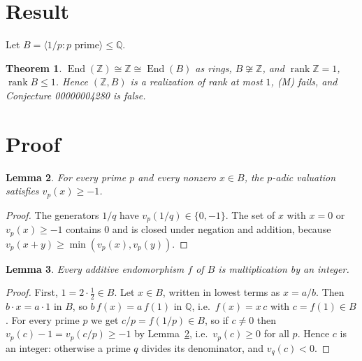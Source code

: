 \documentclass[11pt]{article}
\theoremstyle{plain}
\newtheorem{theorem}{Theorem}
\newtheorem{lemma}[theorem]{Lemma}
\theoremstyle{definition}
\theoremstyle{remark}
\newcommand{\Z}{\mathbb Z}
\newcommand{\Q}{\mathbb Q}
\newcommand{\End}{\operatorname{End}}
\begin{document}
\section{Result}

Let $B=\langle 1/p : p\text{ prime}\rangle\le\Q$.

\begin{theorem}\label{thm:main}
$\End(\Z)\cong\Z\cong\End(B)$ as rings, $B\not\cong\Z$, and
$\operatorname{rank}\Z=1$, $\operatorname{rank}B\le1$. Hence $(\Z,B)$ is a
realization of rank at most $1$, (M) fails, and Conjecture 00000004280 is false.
\end{theorem}

\section{Proof}

\begin{lemma}\label{lem:val}
For every prime $p$ and every nonzero $x\in B$, the $p$-adic valuation satisfies
$v_p(x)\ge-1$.
\end{lemma}

\begin{proof}
The generators $1/q$ have $v_p(1/q)\in\{0,-1\}$. The set of $x$ with $x=0$ or
$v_p(x)\ge-1$ contains $0$ and is closed under negation and addition, because
$v_p(x+y)\ge\min(v_p(x),v_p(y))$.
\end{proof}

\begin{lemma}\label{lem:endo}
Every additive endomorphism $f$ of $B$ is multiplication by an integer.
\end{lemma}

\begin{proof}
First, $1=2\cdot\frac12\in B$. Let $x\in B$, written in lowest terms as $x=a/b$. Then
$b\cdot x=a\cdot1$ in $B$, so $b\,f(x)=a\,f(1)$ in $\Q$, i.e.\ $f(x)=x\,c$ with
$c=f(1)\in B$. For every prime $p$ we get $c/p=f(1/p)\in B$, so if $c\ne0$ then
$v_p(c)-1=v_p(c/p)\ge-1$ by Lemma~\ref{lem:val}, i.e.\ $v_p(c)\ge0$ for all $p$.
Hence $c$ is an integer: otherwise a prime $q$ divides its denominator, and $v_q(c)<0$.
\end{proof}
\end{document}
